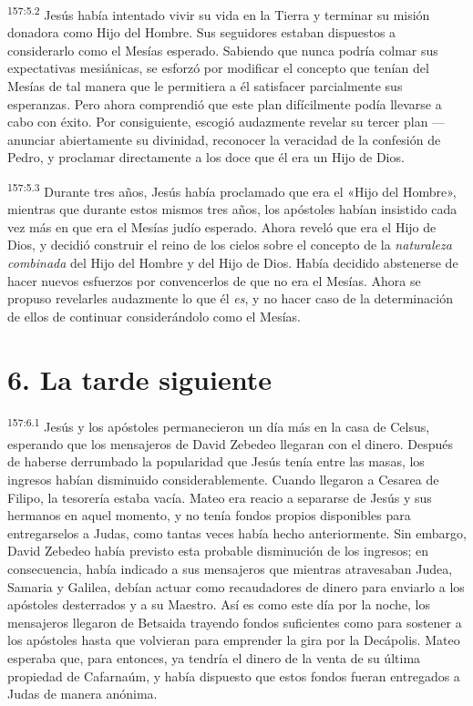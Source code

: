 \par 
\textsuperscript{157:5.2} Jesús había intentado vivir su vida en la Tierra y terminar su misión donadora como Hijo del Hombre. Sus seguidores estaban dispuestos a considerarlo como el Mesías esperado. Sabiendo que nunca podría colmar sus expectativas mesiánicas, se esforzó por modificar el concepto que tenían del Mesías de tal manera que le permitiera a él satisfacer parcialmente sus esperanzas. Pero ahora comprendió que este plan difícilmente podía llevarse a cabo con éxito. Por consiguiente, escogió audazmente revelar su tercer plan ---anunciar abiertamente su divinidad, reconocer la veracidad de la confesión de Pedro, y proclamar directamente a los doce que él era un Hijo de Dios.

\par 
\textsuperscript{157:5.3} Durante tres años, Jesús había proclamado que era el «Hijo del Hombre», mientras que durante estos mismos tres años, los apóstoles habían insistido cada vez más en que era el Mesías judío esperado. Ahora reveló que era el Hijo de Dios, y decidió construir el reino de los cielos sobre el concepto de la \textit{naturaleza combinada} del Hijo del Hombre y del Hijo de Dios. Había decidido abstenerse de hacer nuevos esfuerzos por convencerlos de que no era el Mesías. Ahora se propuso revelarles audazmente lo que él \textit{es}, y no hacer caso de la determinación de ellos de continuar considerándolo como el Mesías.

\section*{6. La tarde siguiente}
\par 
\textsuperscript{157:6.1} Jesús y los apóstoles permanecieron un día más en la casa de Celsus, esperando que los mensajeros de David Zebedeo llegaran con el dinero. Después de haberse derrumbado la popularidad que Jesús tenía entre las masas, los ingresos habían disminuido considerablemente. Cuando llegaron a Cesarea de Filipo, la tesorería estaba vacía. Mateo era reacio a separarse de Jesús y sus hermanos en aquel momento, y no tenía fondos propios disponibles para entregarselos a Judas, como tantas veces había hecho anteriormente. Sin embargo, David Zebedeo había previsto esta probable disminución de los ingresos; en consecuencia, había indicado a sus mensajeros que mientras atravesaban Judea, Samaria y Galilea, debían actuar como recaudadores de dinero para enviarlo a los apóstoles desterrados y a su Maestro. Así es como este día por la noche, los mensajeros llegaron de Betsaida trayendo fondos suficientes como para sostener a los apóstoles hasta que volvieran para emprender la gira por la Decápolis. Mateo esperaba que, para entonces, ya tendría el dinero de la venta de su última propiedad de Cafarnaúm, y había dispuesto que estos fondos fueran entregados a Judas de manera anónima.

